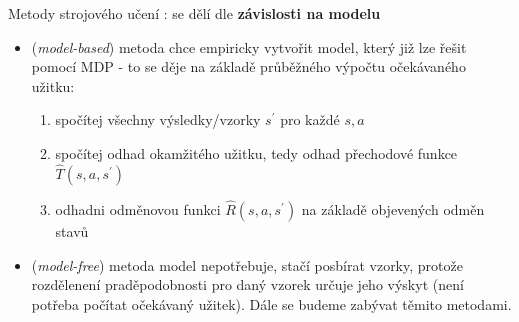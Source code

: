 Metody strojového učení \cite{RLIntro}: se dělí dle \textbf{závislosti na modelu } 
\begin{itemize}
\item (\textit{model-based}) metoda chce empiricky vytvořit model, který již lze řešit pomocí MDP - to se děje na základě průběžného výpočtu očekávaného užitku: 
\begin{enumerate}
\item spočítej všechny výsledky/vzorky $s^\prime$ pro každé $s,a$
\item spočítej odhad okamžitého užitku, tedy odhad přechodové funkce $\hat{T}(s,a,s^\prime)$
\item odhadni odměnovou funkci $\hat{R}(s,a,s^\prime)$ na základě objevených odměn stavů
\end{enumerate}
\item (\textit{model-free}) metoda model nepotřebuje, stačí posbírat vzorky, protože rozdělenení praděpodobnosti pro daný vzorek určuje jeho výskyt (není potřeba počítat očekávaný užitek). Dále se budeme zabývat těmito metodami.
\end{itemize}

